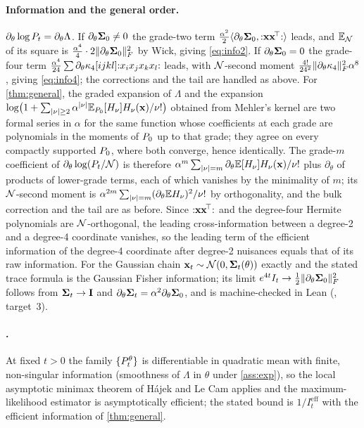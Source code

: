 \paragraph{Information and the general order.}
$\partial_\theta\log P_t=\partial_\theta\Lambda$. If $\partial_\theta\mathbf{\Sigma}_0\neq0$ the
grade-two term $\tfrac{\alpha^2}2\langle\partial_\theta\mathbf{\Sigma}_0,{:}\mathbf{x}\mathbf{x}^{\!\top}{:}\rangle$
leads, and $\mathbb{E}_{\mathcal{N}}$ of its square is
$\tfrac{\alpha^4}4\cdot2\lVert \partial_\theta\mathbf{\Sigma}_0 \rVert_{F}^2$ by Wick, giving \cref{eq:info2}.
If $\partial_\theta\mathbf{\Sigma}_0=0$ the grade-four term
$\tfrac{\alpha^4}{24}\sum\partial_\theta\kappa_4[ijkl]{:}x_ix_jx_kx_l{:}$ leads, with
$\mathcal{N}$-second moment $\tfrac{4!}{24^2}\lVert \partial_\theta\kappa_4 \rVert_{F}^2\alpha^8$, giving
\cref{eq:info4}; the corrections and the tail are handled as above. For
\cref{thm:general}, the graded expansion of $\Lambda$ and the expansion
$\log\bigl(1+\sum_{|\nu|\ge2}\alpha^{|\nu|}\mathbb{E}_{P_0}[H_\nu]H_\nu(\mathbf{x})/\nu!\bigr)$ obtained
from Mehler's kernel are two formal series in $\alpha$ for the same function whose
coefficients at each grade are polynomials in the moments of $P_0$ up to that grade; they
agree on every compactly supported $P_0$, where both converge, hence identically. The
grade-$m$ coefficient of $\partial_\theta\log(P_t/\mathcal{N})$ is therefore
$\alpha^m\sum_{|\nu|=m}\partial_\theta\mathbb{E}[H_\nu]H_\nu(\mathbf{x})/\nu!$ plus $\partial_\theta$ of
products of lower-grade terms, each of which vanishes by the minimality of $m$; its
$\mathcal{N}$-second moment is $\alpha^{2m}\sum_{|\nu|=m}(\partial_\theta\mathbb{E} H_\nu)^2/\nu!$ by
orthogonality, and the bulk correction and the tail are as before. Since
${:}\mathbf{x}\mathbf{x}^{\!\top}{:}$ and the degree-four Hermite polynomials are $\mathcal{N}$-orthogonal,
the leading cross-information between a degree-2 and a degree-4 coordinate vanishes, so
the leading term of the efficient information of the degree-4 coordinate after
degree-2 nuisances equals that of its raw information. For the Gaussian chain
$\mathbf{x}_t\sim\mathcal{N}\!\left(0,\mathbf{\Sigma}_t(\theta)\right)$ exactly and the stated trace formula is the
Gaussian Fisher information; its limit $e^{4t}I_t\to\tfrac12\lVert \partial_\theta\mathbf{\Sigma}_0 \rVert_{F}^2$
follows from $\mathbf{\Sigma}_t\to\mathbf{I}$ and $\partial_\theta\mathbf{\Sigma}_t=\alpha^2\partial_\theta\mathbf{\Sigma}_0$, and
is machine-checked in Lean (, target~3).

\paragraph{.}
At fixed $t>0$ the family $\{P_t^\theta\}$ is differentiable in quadratic mean with
finite, non-singular information (smoothness of $\Lambda$ in $\theta$ under
\cref{ass:exp}), so the local asymptotic minimax theorem of H\'ajek and Le Cam applies
and the maximum-likelihood estimator is asymptotically efficient; the stated bound is
$1/I_t^{\mathrm{eff}}$ with the efficient information of \cref{thm:general}.

